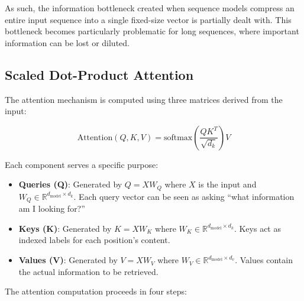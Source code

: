 As such, the information bottleneck created when sequence models compress an entire input sequence into a single fixed-size vector is partially dealt with. This bottleneck becomes particularly problematic for long sequences, where important information can be lost or diluted.


\subsection{Scaled Dot-Product Attention}

The attention mechanism is computed using three matrices derived from the input:

\begin{equation}
\text{Attention}(Q, K, V) = \text{softmax}\left(\frac{QK^T}{\sqrt{d_k}}\right)V
\end{equation}

Each component serves a specific purpose:

\begin{itemize}
   \item \textbf{Queries (Q)}: Generated by $Q = XW_Q$ where $X$ is the input and $W_Q \in \mathbb{R}^{d_{\text{model}} \times d_k}$. Each query vector can be seen as asking ``what information am I looking for?''
   \item \textbf{Keys (K)}: Generated by $K = XW_K$ where $W_K \in \mathbb{R}^{d_{\text{model}} \times d_k}$. Keys act as indexed labels for each position's content.
   \item \textbf{Values (V)}: Generated by $V = XW_V$ where $W_V \in \mathbb{R}^{d_{\text{model}} \times d_v}$. Values contain the actual information to be retrieved.
\end{itemize}

The attention computation proceeds in four steps:

